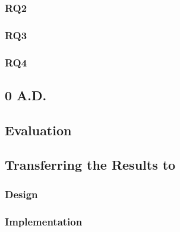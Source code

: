 \subsubsection{RQ2}
\subsubsection{RQ3}
\subsubsection{RQ4}

\subsection{0 A.D.}

\subsection{Evaluation}

\subsection{Transferring the Results to \UH{}}
\subsubsection{Design}
\subsubsection{Implementation}

